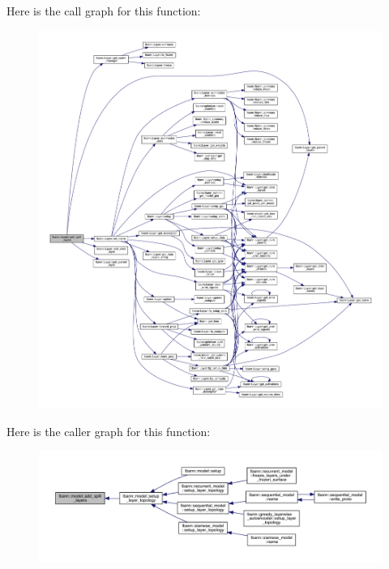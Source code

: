 Here is the call graph for this function\+:\nopagebreak
\begin{figure}[H]
\begin{center}
\leavevmode
\includegraphics[width=350pt]{classlbann_1_1model_ac56d43e457cd4dfc3b88122bd10d286e_cgraph}
\end{center}
\end{figure}
Here is the caller graph for this function\+:\nopagebreak
\begin{figure}[H]
\begin{center}
\leavevmode
\includegraphics[width=350pt]{classlbann_1_1model_ac56d43e457cd4dfc3b88122bd10d286e_icgraph}
\end{center}
\end{figure}
\mbox{\label{classlbann_1_1model_af35fca77e75eb6dd570e4727aa3d5b6b}} 
